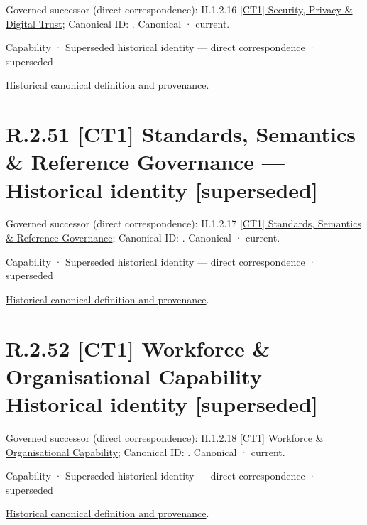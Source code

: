 {\small Governed successor (direct correspondence): II.1.2.16 \hyperref[element:71f0431fdfcd4f779e16d9e5ea609833]{[CT1] Security, Privacy \& Digital Trust}; Canonical ID: \texttt{}. Canonical · current.}\par
\label{element:b01441b2f5584fc2b9c3988643a7c93b}
{\small Capability · Superseded historical identity — direct correspondence · superseded}\par
\href{../../../../continuum/strategy/capability/b01441b2f5584fc2b9c3988643a7c93b.md}{Historical canonical definition and provenance}.\par
\section*{R.2.51 [CT1] Standards, Semantics \& Reference Governance — Historical identity [superseded]}
\label{navigation:R.2.51}

{\small Governed successor (direct correspondence): II.1.2.17 \hyperref[element:5ffeb7401d314f06b05d79c3aff98242]{[CT1] Standards, Semantics \& Reference Governance}; Canonical ID: \texttt{}. Canonical · current.}\par
\label{element:3b65a3d007f54aa9b875e655475e1786}
{\small Capability · Superseded historical identity — direct correspondence · superseded}\par
\href{../../../../continuum/strategy/capability/3b65a3d007f54aa9b875e655475e1786.md}{Historical canonical definition and provenance}.\par
\section*{R.2.52 [CT1] Workforce \& Organisational Capability — Historical identity [superseded]}
\label{navigation:R.2.52}

{\small Governed successor (direct correspondence): II.1.2.18 \hyperref[element:631b43664bfb4c50ac8cf4958b2c347d]{[CT1] Workforce \& Organisational Capability}; Canonical ID: \texttt{}. Canonical · current.}\par
\label{element:b1161fe1a315420fbc7d048a1ea58126}
{\small Capability · Superseded historical identity — direct correspondence · superseded}\par
\href{../../../../continuum/strategy/capability/b1161fe1a315420fbc7d048a1ea58126.md}{Historical canonical definition and provenance}.\par
